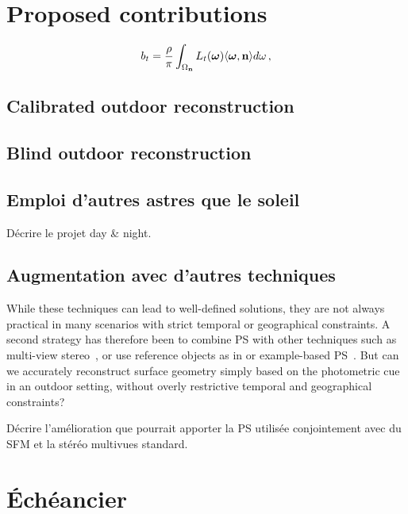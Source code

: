 \documentclass{report}
\begin{document}
\chapter{Proposed contributions}


\begin{equation}
b_t = \frac{\rho}{\pi} \int_{\Omega_{\bf n}} L_t(\mathbf{\boldsymbol \omega}) \langle \boldsymbol \omega, {\bf n} \rangle d\omega \,,
\end{equation}

\section{Calibrated outdoor reconstruction}

\section{Blind outdoor reconstruction}

\section{Emploi d'autres astres que le soleil}

Décrire le projet day \& night.

\section{Augmentation avec d'autres techniques}

While these techniques can lead to well-defined solutions, they are not always practical in many scenarios with strict temporal or geographical constraints. A second strategy has therefore been to combine PS with other techniques such as multi-view stereo~\cite{inose-tcva-13,shi-3dv-14}, or use reference objects as in \cite{johnson-cvpr-11} or example-based PS~\cite{hertzmann-pami-05,ackermann-3dv-14}. But can we accurately reconstruct surface geometry simply based on the photometric cue in an outdoor setting, without overly restrictive temporal and geographical constraints?

Décrire l'amélioration que pourrait apporter la PS utilisée conjointement avec du SFM et la stéréo multivues standard.


\chapter{Échéancier}
\end{document}

